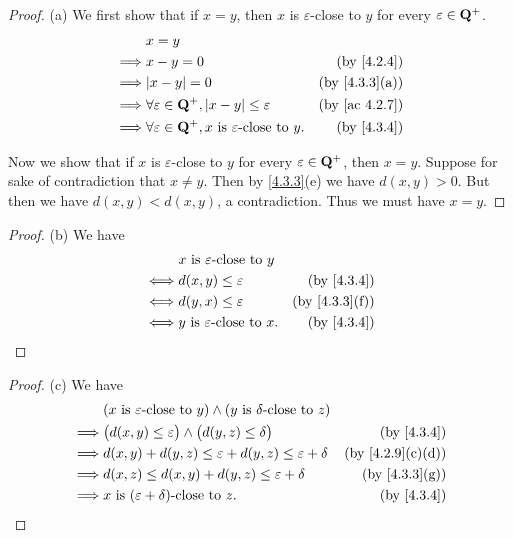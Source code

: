 \begin{proof}{(a)}
  We first show that if \(x = y\), then \(x\) is \(\varepsilon\)-close to \(y\) for every \(\varepsilon \in \mathbf{Q}^+\).
  \begin{align*}
             & x = y                                                                                                 \\
    \implies & x - y = 0                                                               & \text{(by \cref{4.2.4})}    \\
    \implies & \abs{x - y} = 0                                                         & \text{(by \cref{4.3.3}(a))} \\
    \implies & \forall \varepsilon \in \Q^+, \abs{x - y} \leq \varepsilon              & \text{(by \cref{ac 4.2.7})} \\
    \implies & \forall \varepsilon \in \Q^+, x \text{ is \(\varepsilon\)-close to } y. & \text{(by \cref{4.3.4})}
  \end{align*}

  Now we show that if \(x\) is \(\varepsilon\)-close to \(y\) for every \(\varepsilon \in \mathbf{Q}^+\), then \(x = y\).
  Suppose for sake of contradiction that \(x \neq y\).
  Then by \cref{4.3.3}(e) we have \(d(x, y) > 0\).
  But then we have \(d(x, y) < d(x, y)\), a contradiction.
  Thus we must have \(x = y\).
\end{proof}

\begin{proof}{(b)}
  We have
  \begin{align*}
         & x \text{ is \(\varepsilon\)-close to } y                                \\
    \iff & d(x, y) \leq \varepsilon                  & \text{(by \cref{4.3.4})}    \\
    \iff & d(y, x) \leq \varepsilon                  & \text{(by \cref{4.3.3}(f))} \\
    \iff & y \text{ is \(\varepsilon\)-close to } x. & \text{(by \cref{4.3.4})}
  \end{align*}
\end{proof}

\begin{proof}{(c)}
  We have
  \begin{align*}
             & (x \text{ is \(\varepsilon\)-close to } y) \land (y \text{ is \(\delta\)-close to } z)                                  \\
    \implies & \big(d(x, y) \leq \varepsilon\big) \land \big(d(y, z) \leq \delta\big)                 & \text{(by \cref{4.3.4})}       \\
    \implies & d(x, y) + d(y, z) \leq \varepsilon + d(y, z) \leq \varepsilon + \delta                 & \text{(by \cref{4.2.9}(c)(d))} \\
    \implies & d(x, z) \leq d(x, y) + d(y, z) \leq \varepsilon + \delta                               & \text{(by \cref{4.3.3}(g))}    \\
    \implies & x \text{ is \((\varepsilon + \delta)\)-close to } z.                                   & \text{(by \cref{4.3.4})}
  \end{align*}
\end{proof}

